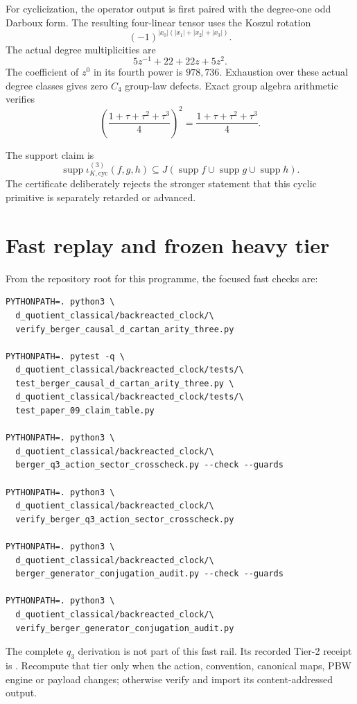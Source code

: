 \documentclass[11pt]{article}
\begin{document}
For cyclicization, the operator output is first paired with the degree-one odd
Darboux form.  The resulting four-linear tensor uses the Koszul rotation
\[
 (-1)^{|x_0|(|x_1|+|x_2|+|x_3|)}.
\]
The actual degree multiplicities are
\[
 5z^{-1}+22+22z+5z^2.
\]
The coefficient of $z^0$ in its fourth power is $978{,}736$.  Exhaustion over
these actual degree classes gives zero $C_4$ group-law defects.  Exact group
algebra arithmetic verifies
\[
 \left(\frac{1+\tau+\tau^2+\tau^3}{4}\right)^2
 =\frac{1+\tau+\tau^2+\tau^3}{4}.
\]

The support claim is
\[
 \operatorname{supp}\iota_{K,\mathrm{cyc}}^{(3)}(f,g,h)
 \subseteq J(\operatorname{supp}f\cup\operatorname{supp}g
 \cup\operatorname{supp}h).
\]
The certificate deliberately rejects the stronger statement that this cyclic
primitive is separately retarded or advanced.

\section{Fast replay and frozen heavy tier}

From the repository root for this programme, the focused fast checks are:
\begin{verbatim}
PYTHONPATH=. python3 \
  d_quotient_classical/backreacted_clock/\
  verify_berger_causal_d_cartan_arity_three.py

PYTHONPATH=. pytest -q \
  d_quotient_classical/backreacted_clock/tests/\
  test_berger_causal_d_cartan_arity_three.py \
  d_quotient_classical/backreacted_clock/tests/\
  test_paper_09_claim_table.py

PYTHONPATH=. python3 \
  d_quotient_classical/backreacted_clock/\
  berger_q3_action_sector_crosscheck.py --check --guards

PYTHONPATH=. python3 \
  d_quotient_classical/backreacted_clock/\
  verify_berger_q3_action_sector_crosscheck.py

PYTHONPATH=. python3 \
  d_quotient_classical/backreacted_clock/\
  berger_generator_conjugation_audit.py --check --guards

PYTHONPATH=. python3 \
  d_quotient_classical/backreacted_clock/\
  verify_berger_generator_conjugation_audit.py
\end{verbatim}

The complete $q_3$ derivation is not part of this fast rail.  Its recorded
Tier-2 receipt is
.
Recompute that tier only when the action, convention, canonical maps, PBW
engine or payload changes; otherwise verify and import its content-addressed
output.
\end{document}
